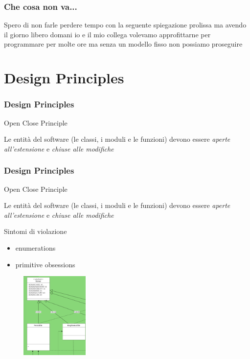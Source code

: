 \documentclass{beamer}
\begin{document}
\begin{frame}
\frametitle{Che cosa non va...}
Spero di non farle perdere tempo con la seguente spiegazione prolissa ma avendo il giorno libero domani io e il mio collega volevamo approfittarne per programmare per molte ore ma senza un modello fisso non possiamo proseguire
\end{frame}




\section{Design Principles}



\begin{frame}
\frametitle{Design Principles}
Open Close Principle
\begin{framed}
Le entit\`a del software (le classi, i moduli e le funzioni) devono essere \emph{aperte all'estensione} e \emph{chiuse alle modifiche}\\
\end{framed}
\end{frame}


\begin{frame}
\frametitle{Design Principles}
Open Close Principle
\begin{framed}
Le entit\`a del software (le classi, i moduli e le funzioni) devono essere \emph{aperte all'estensione} e \emph{chiuse alle modifiche}\\
\end{framed}
Sintomi di violazione 
\begin{itemize}
\item enumerations
\item primitive obsessions 
\end{itemize}
\begin{figure}
\centering
\includegraphics[width=0.3\textwidth]{Img/primitiveObsession.png}
\end{figure}
\end{frame}
\end{document}
